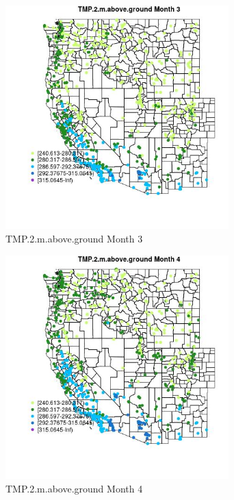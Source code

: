 \begin{figure} 
\centering  
\includegraphics[width=0.77\textwidth]{Code_Outputs/Report_ML_input_PM25_Step4_part_e_de_duplicated_aves_compiled_2019-05-21wNAs_MapObsMo3TMP2maboveground.jpg} 
\caption{\label{fig:Report_ML_input_PM25_Step4_part_e_de_duplicated_aves_compiled_2019-05-21wNAsMapObsMo3TMP2maboveground}TMP.2.m.above.ground Month 3} 
\end{figure} 
 

\begin{figure} 
\centering  
\includegraphics[width=0.77\textwidth]{Code_Outputs/Report_ML_input_PM25_Step4_part_e_de_duplicated_aves_compiled_2019-05-21wNAs_MapObsMo4TMP2maboveground.jpg} 
\caption{\label{fig:Report_ML_input_PM25_Step4_part_e_de_duplicated_aves_compiled_2019-05-21wNAsMapObsMo4TMP2maboveground}TMP.2.m.above.ground Month 4} 
\end{figure} 
 

